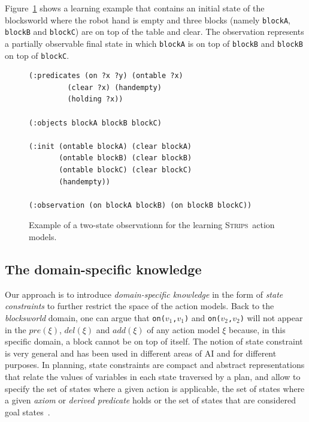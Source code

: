 \documentclass{article}
\newcommand{\strips}{\textsc{Strips}}
\begin{document}
Figure~\ref{fig:observation} shows a learning example that contains an initial state of the blocksworld where the robot hand is empty and three blocks (namely {\small\tt blockA}, {\small\tt blockB} and {\small\tt blockC}) are on top of the table and clear. The observation represents a partially observable final state in which {\tt\small{blockA}} is on top of {\tt\small{blockB}} and {\tt\small{blockB}} on top of {\tt\small{blockC}}.

\begin{figure}[hbt!]
  \begin{tiny}
  \begin{verbatim}
(:predicates (on ?x ?y) (ontable ?x)
	     (clear ?x) (handempty)
	     (holding ?x))

(:objects blockA blockB blockC)

(:init (ontable blockA) (clear blockA)
       (ontable blockB) (clear blockB)
       (ontable blockC) (clear blockC)
       (handempty))

(:observation (on blockA blockB) (on blockB blockC))
  \end{verbatim}
  \end{tiny}
	\caption{\small Example of a two-state observationn for the learning \strips\ action models.}
	\label{fig:observation}
\end{figure}


\subsection{The domain-specific knowledge}

Our approach is to introduce {\em domain-specific knowledge} in the form of {\em state constraints} to further restrict the space of the action models. Back to the {\em blocksworld} domain, one can argue that {\small\tt on($v_1$,$v_1$)} and {\small\tt on($v_2$,$v_2$)} will not appear in the $pre(\xi)$, $del(\xi)$ and $add(\xi)$ of any action model $\xi$ because, in this specific domain, a block cannot be on top of itself. The notion of state constraint is very general and has been used in different areas of AI and for different purposes.  In planning, state constraints are compact and abstract representations that relate the values of variables in each state traversed by a plan, and allow to specify the set of states where a given action is applicable, the set of states where a given {\em axiom} or {\em derived predicate} holds or the set of states that are considered goal states~\cite{HaslumIR0TSN18}.
\end{document}
